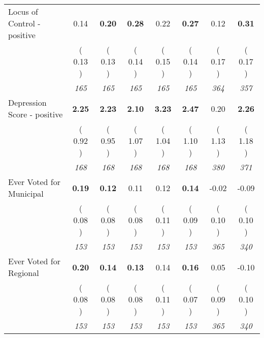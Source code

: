 \begin{tabular}{l c c c c c c c}
Locus of Control - positive &      0.14 & \textbf{      0.20 } & \textbf{      0.28 } &      0.22 & \textbf{     0.27} &      0.12 & \textbf{      0.31 } \\
& (     0.13 ) & (     0.13 ) & (     0.14 ) & (     0.15 ) & (     0.14 ) & (     0.17 ) & (     0.17 ) \\
& \textit{ 165 } & \textit{ 165 } & \textit{ 165 } & \textit{ 165 } & \textit{ 165 } & \textit{ 364 } & \textit{ 357 } \\
Depression Score - positive & \textbf{      2.25 } & \textbf{      2.23 } & \textbf{      2.10 } & \textbf{     3.23} & \textbf{     2.47} &      0.20 & \textbf{      2.26 } \\
& (     0.92 ) & (     0.95 ) & (     1.07 ) & (     1.04 ) & (     1.10 ) & (     1.13 ) & (     1.18 ) \\
& \textit{ 168 } & \textit{ 168 } & \textit{ 168 } & \textit{ 168 } & \textit{ 168 } & \textit{ 380 } & \textit{ 371 } \\
Ever Voted for Municipal & \textbf{      0.19 } & \textbf{      0.12 } &      0.11 &      0.12 & \textbf{     0.14} &     -0.02 &     -0.09 \\
& (     0.08 ) & (     0.08 ) & (     0.08 ) & (     0.11 ) & (     0.09 ) & (     0.10 ) & (     0.10 ) \\
& \textit{ 153 } & \textit{ 153 } & \textit{ 153 } & \textit{ 153 } & \textit{ 153 } & \textit{ 365 } & \textit{ 340 } \\
Ever Voted for Regional & \textbf{      0.20 } & \textbf{      0.14 } & \textbf{      0.13 } &      0.14 & \textbf{     0.16} &      0.05 &     -0.10 \\
& (     0.08 ) & (     0.08 ) & (     0.08 ) & (     0.11 ) & (     0.07 ) & (     0.09 ) & (     0.10 ) \\
& \textit{ 153 } & \textit{ 153 } & \textit{ 153 } & \textit{ 153 } & \textit{ 153 } & \textit{ 365 } & \textit{ 340 } \\
\bottomrule
\end{tabular}

